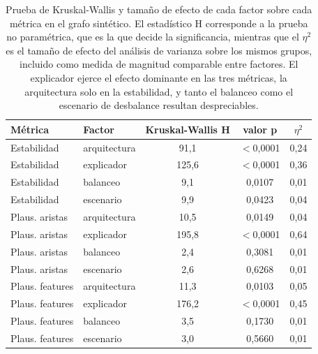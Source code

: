 \begin{table}[htbp]
\centering
\renewcommand{\arraystretch}{1.3}
\small
\begin{tabular}{ll ccc}
\toprule
\textbf{Métrica} & \textbf{Factor} & \textbf{Kruskal-Wallis H} & \textbf{valor p} & \textbf{$\eta^2$} \\
\midrule
Estabilidad & arquitectura & 91,1 & $<$0,0001 & 0,24 \\
Estabilidad & explicador & 125,6 & $<$0,0001 & 0,36 \\
Estabilidad & balanceo & 9,1 & 0,0107 & 0,01 \\
Estabilidad & escenario & 9,9 & 0,0423 & 0,04 \\
\midrule
Plaus. aristas & arquitectura & 10,5 & 0,0149 & 0,04 \\
Plaus. aristas & explicador & 195,8 & $<$0,0001 & 0,64 \\
Plaus. aristas & balanceo & 2,4 & 0,3081 & 0,01 \\
Plaus. aristas & escenario & 2,6 & 0,6268 & 0,01 \\
\midrule
Plaus. features & arquitectura & 11,3 & 0,0103 & 0,05 \\
Plaus. features & explicador & 176,2 & $<$0,0001 & 0,45 \\
Plaus. features & balanceo & 3,5 & 0,1730 & 0,01 \\
Plaus. features & escenario & 3,0 & 0,5660 & 0,01 \\
\bottomrule
\end{tabular}
\caption{Prueba de Kruskal-Wallis y tamaño de efecto de cada factor sobre cada métrica en el grafo sintético. El estadístico H corresponde a la prueba no paramétrica, que es la que decide la significancia, mientras que el $\eta^2$ es el tamaño de efecto del análisis de varianza sobre los mismos grupos, incluido como medida de magnitud comparable entre factores. El explicador ejerce el efecto dominante en las tres métricas, la arquitectura solo en la estabilidad, y tanto el balanceo como el escenario de desbalance resultan despreciables.}
\label{tab:synth-stats}
\end{table}
